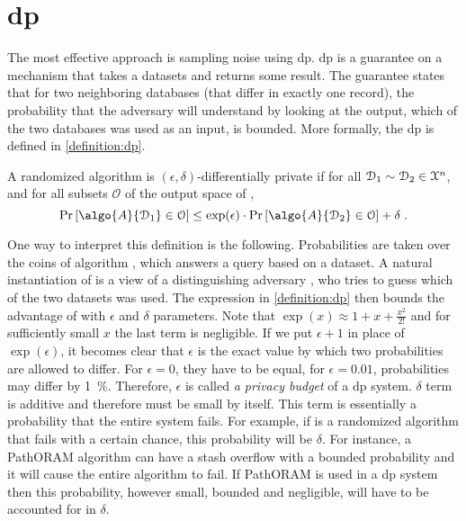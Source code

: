 	\section{\texorpdfstring{\acrlong{dp}}{Differential Privacy}}

		The most effective approach is sampling noise using \acrfull{dp}.
		\acrshort{dp} is a guarantee on a mechanism that takes a datasets and returns some result.
		The guarantee states that for two neighboring databases (that differ in exactly one record), the probability that the adversary will understand by looking at the output, which of the two databases was used as an input, is bounded.
		More formally, the \acrlong{dp} is defined in \cref{definition:dp}.

		\begin{definition}\label{definition:dp}
			A randomized algorithm  is $(\epsilon, \delta)$-differentially private if for all $\mathcal{D}_1 \sim \mathcal{D}_2 \in \mathcal{X}^{n}$, and for all subsets $\mathcal{O}$ of the output space of ,
			\[
				\probability{ \algo{A}{ \database_1 } \in \mathcal{O} } \leq \exp(\epsilon) \cdot \probability{ \algo{A}{ \database_2 } \in \mathcal{O} } + \delta \; .
			\]
		\end{definition}

		One way to interpret this definition is the following.
		Probabilities are taken over the coins of algorithm , which answers a query based on a dataset.
		A natural instantiation of  is a view of a distinguishing adversary \adversary{}, who tries to guess which of the two datasets was used.
		The expression in \cref{definition:dp} then bounds the advantage of \adversary{} with $\epsilon$ and $\delta$ parameters.
		Note that $\exp( x ) \approx 1 + x + \frac{x^2}{2!}$ and for sufficiently small $x$ the last term is negligible.
		If we put $\epsilon + 1$ in place of $\exp( \epsilon )$, it becomes clear that $\epsilon$ is the exact value by which two probabilities are allowed to differ.
		For $\epsilon = 0$, they have to be equal, for $\epsilon = 0.01$, probabilities may differ by \SI{1}{\percent}.
		Therefore, $\epsilon$ is called \emph{a privacy budget} of a \acrshort{dp} system.
		$\delta$ term is additive and therefore must be small by itself.
		This term is essentially a probability that the entire system fails.
		For example, if  is a randomized algorithm that fails with a certain chance, this probability will be $\delta$.
		For instance, a PathORAM \cite{path-oram} algorithm can have a stash overflow with a bounded probability \cite[Theorem 1]{path-oram} and it will cause the entire algorithm to fail.
		If PathORAM is used in a \acrshort{dp} system then this probability, however small, bounded and negligible, will have to be accounted for in $\delta$.

